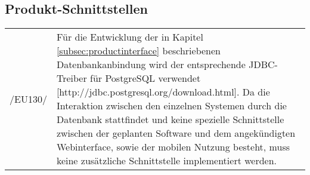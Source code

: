 \subsection{Produkt-Schnittstellen}

\begin{tabular}{p{1.5cm}p{14.5cm}}

	 /EU130/	&  Für die Entwicklung der in Kapitel \ref{subsec:productinterface} beschriebenen Datenbankanbindung wird der entsprechende JDBC-Treiber für PostgreSQL verwendet [http://jdbc.postgresql.org/download.html].
Da die Interaktion zwischen den einzelnen Systemen durch die Datenbank stattfindet und keine spezielle Schnittstelle zwischen der geplanten Software und dem angekündigten Webinterface, sowie der mobilen Nutzung besteht, muss keine zusätzliche Schnittstelle implementiert werden.\\[0.25cm]

\end{tabular}


